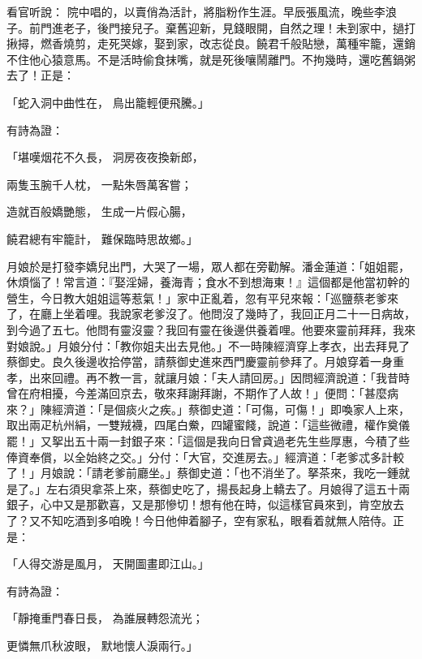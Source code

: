 \begin{showcontents}{}
看官听說： 院中唱的，以賣俏為活計，將脂粉作生涯。早辰張風流，晚些李浪子。前門進老子，後門接兒子。棄舊迎新，見錢眼開，自然之理！未到家中，撾打揪撏，燃香燒剪，走死哭嫁，娶到家，改志從良。饒君千般貼戀，萬種牢籠，還銷不住他心猿意馬。不是活時偷食抹嘴，就是死後嚷鬧離門。不拘幾時，還吃舊鍋粥去了！正是：

「蛇入洞中曲性在，  鳥出籠輕便飛騰。」

有詩為證：

「堪嘆烟花不久長，  洞房夜夜換新郎，

兩隻玉腕千人枕，  一點朱唇萬客嘗；

造就百般嬌艷態，  生成一片假心腸，

饒君總有牢籠計，  難保臨時思故鄉。」

月娘於是打發李嬌兒出門，大哭了一場，眾人都在旁勸解。潘金蓮道：「姐姐罷，休煩惱了！常言道：『娶淫婦，養海青；食水不到想海東！』這個都是他當初幹的營生，今日教大姐姐這等惹氣！」家中正亂着，忽有平兒來報：「巡鹽蔡老爹來了，在廳上坐着哩。我說家老爹沒了。他問沒了幾時了，我回正月二十一日病故，到今過了五七。他問有靈沒靈？我回有靈在後邊供養着哩。他要來靈前拜拜，我來對娘說。」月娘分付：「教你姐夫出去見他。」不一時陳經濟穿上孝衣，出去拜見了蔡御史。良久後邊收拾停當，請蔡御史進來西門慶靈前參拜了。月娘穿着一身重孝，出來回禮。再不教一言，就讓月娘：「夫人請回房。」因問經濟說道：「我昔時曾在府相擾，今差滿回京去，敬來拜謝拜謝，不期作了人故！」便問：「甚麼病來？」陳經濟道：「是個痰火之疾。」蔡御史道：「可傷，可傷！」即喚家人上來，取出兩疋杭州絹，一雙羢襪，四尾白鮝，四罐蜜餞，說道：「這些微禮，權作奠儀罷！」又挐出五十兩一封銀子來：「這個是我向日曾貣過老先生些厚惠，今積了些俸資奉償，以全始終之交。」分付：「大官，交進房去。」經濟道：「老爹忒多計較了！」月娘說：「請老爹前廳坐。」蔡御史道：「也不消坐了。拏茶來，我吃一鍾就是了。」左右須臾拿茶上來，蔡御史吃了，揚長起身上轎去了。月娘得了這五十兩銀子，心中又是那歡喜，又是那慘切！想有他在時，似這樣官員來到，肯空放去了？又不知吃酒到多咱晚！今日他伸着腳子，空有家私，眼看着就無人陪侍。正是：

「人得交游是風月，  天開圖畫即江山。」

有詩為證：

「靜掩重門春日長，  為誰展轉怨流光；

更憐無爪秋波眼，  默地懷人淚兩行。」


\end{showcontents}
